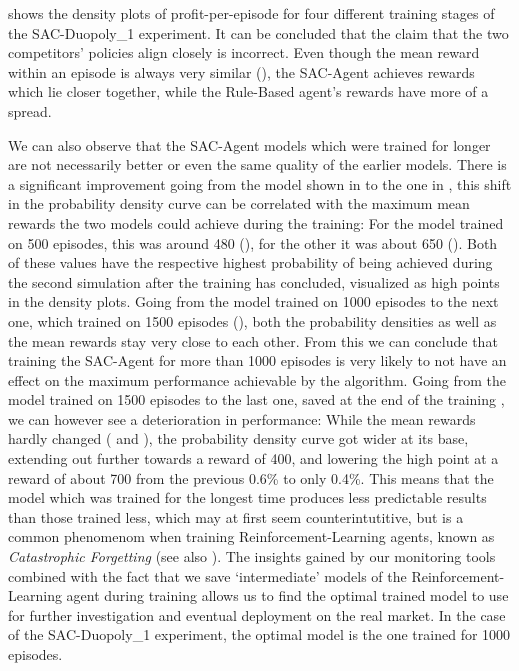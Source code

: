  shows the density plots of profit-per-episode for four different training stages of the SAC-Duopoly\_1 experiment. It can be concluded that the claim that the two competitors' policies align closely is incorrect. Even though the mean reward within an episode is always very similar (), the SAC-Agent achieves rewards which lie closer together, while the Rule-Based agent's rewards have more of a spread.

We can also observe that the SAC-Agent models which were trained for longer are not necessarily better or even the same quality of the earlier models. There is a significant improvement going from the model shown in  to the one in , this shift in the probability density curve can be correlated with the maximum mean rewards the two models could achieve during the training: For the model trained on 500 episodes, this was around 480 (), for the other it was about 650 (). Both of these values have the respective highest probability of being achieved during the second simulation after the training has concluded, visualized as high points in the density plots. Going from the model trained on 1000 episodes to the next one, which trained on 1500 episodes (), both the probability densities as well as the mean rewards stay very close to each other. From this we can conclude that training the SAC-Agent for more than 1000 episodes is very likely to not have an effect on the maximum performance achievable by the algorithm. Going from the model trained on 1500 episodes to the last one, saved at the end of the training , we can however see a deterioration in performance: While the mean rewards hardly changed ( and ), the probability density curve got wider at its base, extending out further towards a reward of 400, and lowering the high point at a reward of about 700 from the previous 0.6\% to only 0.4\%. This means that the model which was trained for the longest time produces less predictable results than those trained less, which may at first seem counterintutitive, but is a common phenomenom when training Reinforcement-Learning agents, known as \emph{Catastrophic Forgetting} (see also \cite{CatastrophicForgetting}). The insights gained by our monitoring tools combined with the fact that we save `intermediate' models of the Reinforcement-Learning agent during training allows us to find the optimal trained model to use for further investigation and eventual deployment on the real market. In the case of the SAC-Duopoly\_1 experiment, the optimal model is the one trained for 1000 episodes.


